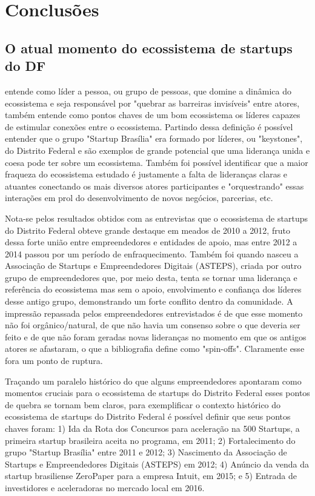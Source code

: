 \chapter[Conclusões]{Conclusões}
\label{cap-conclusoes}

\section{O atual momento do ecossistema de startups do DF}
\label{contexto_atual_do_ecosssistema}

 entende como líder a pessoa, ou grupo de pessoas, que domine a dinâmica do ecossistema e seja responsável por "quebrar as barreiras invisíveis" entre atores,  também entende como pontos chaves de um bom ecossistema os líderes capazes de estimular conexões entre o ecossistema. Partindo dessa definição é possível entender que o grupo "Startup Brasília" era formado por líderes, ou "keystones", do Distrito Federal e são exemplos de grande potencial que uma liderança unida e coesa pode ter sobre um ecossistema. Também foi possível identificar que a maior fraqueza do ecossistema estudado é justamente a falta de lideranças claras e atuantes conectando os mais diversos atores participantes e "orquestrando" essas interações em prol do desenvolvimento de novos negócios, parcerias, etc.

Nota-se pelos resultados obtidos com as entrevistas que o ecossistema de startups do Distrito Federal obteve grande destaque em meados de 2010 a 2012, fruto dessa forte união entre empreendedores e entidades de apoio, mas entre 2012 a 2014 passou por um período de enfraquecimento. Também foi quando nasceu a Associação de Startups e Empreendedores Digitais (ASTEPS), criada por outro grupo de empreendedores que, por meio desta, tenta se tornar uma liderança e referência do ecossistema mas sem o apoio, envolvimento e confiança dos líderes desse antigo grupo, demonstrando um forte conflito dentro da comunidade. A impressão repassada pelos empreendedores entrevistados é de que esse momento não foi orgânico/natural, de que não havia um consenso sobre o que deveria ser feito e de que não foram geradas novas lideranças no momento em que os antigos atores se afastaram, o que a bibliografia define como "spin-offs". Claramente esse fora um ponto de ruptura.

Traçando um paralelo histórico do que alguns empreendedores apontaram como momentos cruciais para o ecossistema de startups do Distrito Federal esses pontos de quebra se tornam bem claros, para exemplificar o contexto histórico do ecossistema de startups do Distrito Federal é possível definir que seus pontos chaves foram: 1) Ida da Rota dos Concursos para aceleração na 500 Startups, a primeira startup brasileira aceita no programa, em 2011; 2) Fortalecimento do grupo "Startup Brasília" entre 2011 e 2012; 3) Nascimento da Associação de Startups e Empreendedores Digitais (ASTEPS) em 2012; 4) Anúncio da venda da startup brasiliense ZeroPaper para a empresa Intuit, em 2015; e 5) Entrada de investidores e aceleradoras no mercado local em 2016. 

